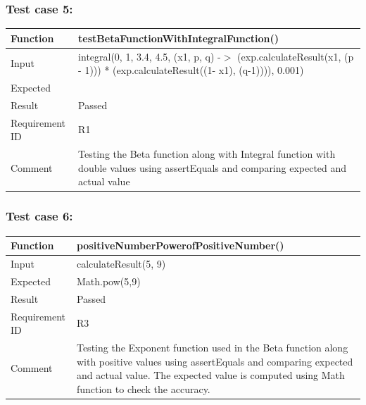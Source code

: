 \documentclass[letterpaper, 11pt]{article}
\begin{document}
        \subsubsection{\textbf{Test case 5:}} 
            \setlength{\tabcolsep}{25pt}
            \renewcommand{\arraystretch}{1.5}
                \begin{tabularx}{1.0\textwidth} { 
                  | >{\raggedright\arraybackslash}X 
                  | >{\raggedright\arraybackslash}X | }
                 \hline
                 Function & testBetaFunctionWithIntegralFunction()\\
                 \hline
                 Input  & integral(0, 1, 3.4, 4.5, (x1, p, q) -$>$ (exp.calculateResult(x1, (p - 1))) * (exp.calculateResult((1- x1), (q-1)))), 0.001)\\
                  \hline
                 Expected  & 0.0084110\\
                  \hline
                 Result  & Passed\\
                  \hline
                 Requirement ID  & R1\\
                    \hline
                 Comment  & Testing the Beta function along with Integral function with double values using assertEquals and comparing expected and actual value\\
                \hline
            \end{tabularx} 
        \subsubsection{\textbf{Test case 6:}} 
            \setlength{\tabcolsep}{25pt}
            \renewcommand{\arraystretch}{1.5}
            \begin{tabularx}{1.0\textwidth} { 
                  | >{\raggedright\arraybackslash}X 
                  | >{\raggedright\arraybackslash}X | }
                 \hline
                 Function & positiveNumberPowerofPositiveNumber()\\
                 \hline
                 Input  & calculateResult(5, 9)\\
                  \hline
                 Expected  & Math.pow(5,9)\\
                  \hline
                 Result  & Passed\\
                  \hline
                 Requirement ID  & R3\\
                    \hline
                 Comment  & Testing the Exponent function used in the Beta function along with positive values using assertEquals and comparing expected and actual value. The expected value is computed using Math function to check the accuracy.\\
                \hline
            \end{tabularx} 
\end{document}
